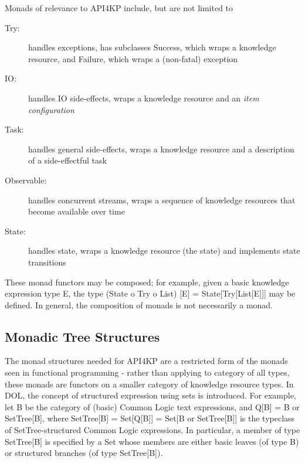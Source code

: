 \documentclass[runningheads]{llncs}
\begin{document}
Monads of relevance to API4KP include, but are not limited to
\begin{description}
\item [Try:] handles exceptions, has subclasses Success, which wraps a knowledge resource, and Failure, which wraps a (non-fatal) exception
\item [IO:] handles IO side-effects, wraps a knowledge resource and an \emph{item configuration}
\item [Task:] handles general side-effects, wraps a knowledge resource and a description of a side-effectful task
\item [Observable:] handles concurrent streams, wraps a sequence of knowledge resources that become available over time
\item [State:] handles state, wraps a knowledge resource (the state) and implements state transitions
\end{description}
These monad functors may be composed; for example, given a basic knowledge expression type E, the type (State o Try o List) [E] = State[Try[List[E]]] may be defined.
In general, the composition of monads is not necessarily a monad. 

\vspace{-0.3cm}
\subsection{Monadic Tree Structures}
The monad structures needed for API4KP are a restricted form of the monads seen in functional programming - rather than applying to category of all types, these monads are functors on a smaller category of knowledge resource types. In DOL, the concept of structured expression using sets is introduced. For example, let B be the category of (basic) Common Logic text expressions, and Q[B] = B or SetTree[B], where SetTree[B] = Set[Q[B]] = Set[B or SetTree[B]]  is the typeclass of SetTree-structured Common Logic expressions. In particular, a member of type SetTree[B] is specified by a Set whose members are either  basic leaves (of type B) or structured branches (of type SetTree[B]). 
\end{document}

